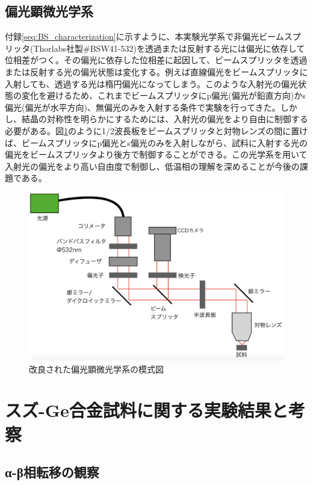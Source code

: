\documentclass[11pt,a4paper]{jsarticle}
\begin{document}
\subsection{偏光顕微光学系}
付録\ref{seq:BS_characterization}に示すように、本実験光学系で非偏光ビームスプリッタ(Thorlabs社製\#BSW41-532)を透過または反射する光には偏光に依存して位相差がつく。その偏光に依存した位相差に起因して、ビームスプリッタを透過または反射する光の偏光状態は変化する。例えば直線偏光をビームスプリッタに入射しても、透過する光は楕円偏光になってしまう。このような入射光の偏光状態の変化を避けるため、これまでビームスプリッタにp偏光(偏光が鉛直方向)かs偏光(偏光が水平方向)、無偏光のみを入射する条件で実験を行ってきた。しかし、結晶の対称性を明らかにするためには、入射光の偏光をより自由に制御する必要がある。図\ref{fig:microscope2}のように1/2波長板をビームスプリッタと対物レンズの間に置けば、ビームスプリッタにp偏光とs偏光のみを入射しながら、試料に入射する光の偏光をビームスプリッタより後方で制御することができる。この光学系を用いて入射光の偏光をより高い自由度で制御し、低温相の理解を深めることが今後の課題である。
\begin{figure}[htb]
  \begin{center}
   \includegraphics[width=120mm]{microscope2.eps}
  \end{center}
  \caption{改良された偏光顕微光学系の模式図}
  \label{fig:microscope2}
\end{figure}


\section{スズ-Ge合金試料に関する実験結果と考察}
\subsection{α-β相転移の観察}
\end{document}
